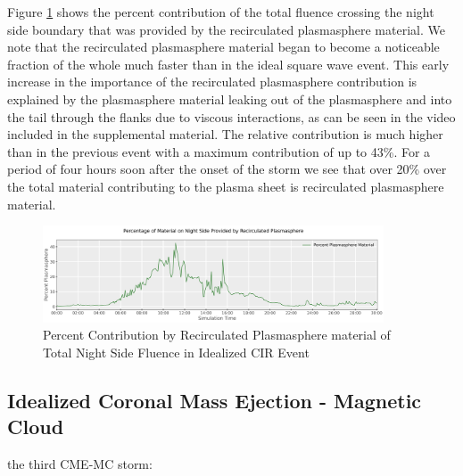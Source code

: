 \documentclass[utf8]{frontiersinFPHY_FAMS}
\begin{document}
Figure \ref{fig:RESULT4} shows the percent contribution of the total fluence crossing the night side boundary that was provided by the recirculated plasmasphere material. We note that the recirculated plasmasphere material began to become a noticeable fraction of the whole much faster than in the ideal square wave event. %
This early increase in the importance of the recirculated plasmasphere contribution is explained by the plasmasphere material leaking out of the plasmasphere and into the tail through the flanks due to viscous interactions, as can be seen in the video included in the supplemental material. The relative contribution is much higher than in the previous event with a maximum contribution of up to 43\%. For a period of four hours soon after the onset of the storm we see that over 20\% over the total material contributing to the plasma sheet is recirculated plasmasphere material. 
 
\begin{figure}[!ht]
\begin{center}
\includegraphics[width=0.9\textwidth]{DGCPM_CIR.PNG}
\caption{Percent Contribution by Recirculated Plasmasphere material of Total Night Side Fluence in Idealized CIR Event}
\label{fig:RESULT4}
\end{center}
\end{figure}

\subsection{Idealized Coronal Mass Ejection - Magnetic Cloud}

the third CME-MC storm:
\end{document}
